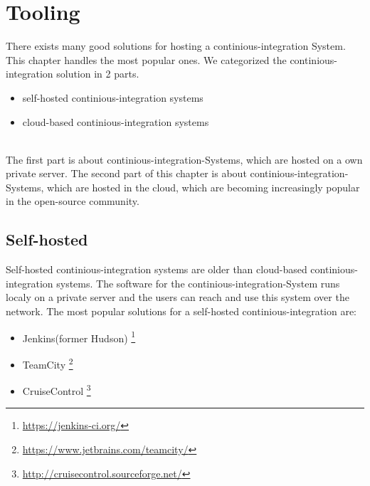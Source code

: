 \section{Tooling}\label{sec:tooling}

There exists many good solutions for hosting a continious-integration System. 
This chapter handles the most popular ones.
We categorized the continious-integration solution in 2 parts. 
\begin{itemize} 
    \item self-hosted continious-integration systems
    \item cloud-based continious-integration systems 
\end{itemize}
\\
The first part is about continious-integration-Systems, which are hosted on a own private server. 
The second part of this chapter is about continious-integration-Systems, which are hosted in the cloud, which are becoming increasingly popular in the open-source community.

\subsection{Self-hosted}\label{sec:tooling-self-hosted}

Self-hosted continious-integration systems are older than cloud-based continious-integration systems.
The software for the continious-integration-System runs localy on a private server 
and the users can reach and use this system over the network. 
The most popular solutions for a self-hosted continious-integration are:
\begin{itemize} 
    \item Jenkins(former Hudson) \footnote{\url{https://jenkins-ci.org/}}
    \item TeamCity \footnote{\url{https://www.jetbrains.com/teamcity/}}
    \item CruiseControl \footnote{\url{http://cruisecontrol.sourceforge.net/}}
\end{itemize}

